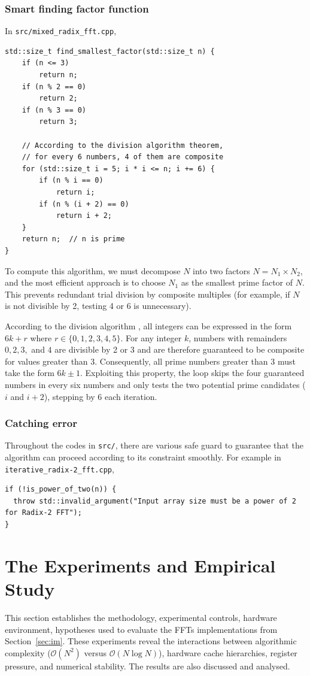\documentclass{article}
\begin{document}
\subsubsection{Smart finding factor function}
In \texttt{src/mixed\_radix\_fft.cpp}, 
\begin{lstlisting}[style=latte-cpp]
std::size_t find_smallest_factor(std::size_t n) {
    if (n <= 3)
        return n;
    if (n % 2 == 0)
        return 2;
    if (n % 3 == 0)
        return 3;

    // According to the division algorithm theorem,
    // for every 6 numbers, 4 of them are composite
    for (std::size_t i = 5; i * i <= n; i += 6) {
        if (n % i == 0)
            return i;
        if (n % (i + 2) == 0)
            return i + 2;
    }
    return n;  // n is prime
}\end{lstlisting}
To compute this algorithm, we must decompose $N$ into two factors $N = N_1 \times N_2$, and the most efficient approach is to choose $N_1$ as the smallest prime factor of $N$. This prevents redundant trial division by composite multiples (for example, if $N$ is not divisible by 2, testing 4 or 6 is unnecessary). 

According to the division algorithm \cite{crandall2005}, all integers can be expressed in the form $6k + r$ where $r \in \{0, 1, 2, 3, 4, 5\}$. For any integer $k$, numbers with remainders $0, 2, 3,$ and $4$ are divisible by 2 or 3 and are therefore guaranteed to be composite for values greater than 3. Consequently, all prime numbers greater than 3 must take the form $6k \pm 1$. Exploiting this property, the loop skips the four guaranteed numbers in every six numbers and only tests the two potential prime candidates ($i$ and $i+2$), stepping by $6$ each iteration.

\subsubsection{Catching error}
Throughout the codes in \texttt{src/}, there are various safe guard to guarantee that the algorithm can proceed according to its constraint smoothly. For example in \texttt{iterative\_radix-2\_fft.cpp}, 
\begin{lstlisting}[style=latte-cpp]
if (!is_power_of_two(n)) {
  throw std::invalid_argument("Input array size must be a power of 2 for Radix-2 FFT");
}
\end{lstlisting}

\section{The Experiments and Empirical Study} 
This section establishes the methodology, experimental controls, hardware environment, hypotheses used to evaluate the FFTs implementations from Section~\ref{sec:im}. These experiments reveal the interactions between algorithmic complexity ($\mathcal{O}(N^2)$ versus $\mathcal{O}(N \log N)$), hardware cache hierarchies, register pressure, and numerical stability. The results are also discussed and analysed.
\end{document}
